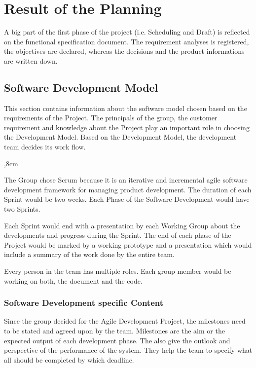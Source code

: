 \section{Result of the Planning}
A big part of the first phase of the project (i.e. Scheduling and Draft) is reflected on the functional specification document. The requirement analyses is registered, the objectives are declared, whereas the decisions and the product informations are written down.

\subsection{Software Development Model}

This section contains information about the software model chosen based on the requirements of the Project.
The principals of the group, the customer requirement and knowledge about the Project play an important role in choosing the Development Model. Based on the Development Model, the development team decides its work flow. 

\begin{description}
	,8cm
	\item[Agile Development Model: SCRUM] The Group chose Scrum because it is an iterative and incremental agile software development framework for managing product development. The duration of each Sprint would be two weeks. Each Phase of the Software Development would have two Sprints. 
	
	Each Sprint would end with a presentation by each Working Group about the developments and progress during the Sprint. The end of each phase of the Project would be marked by a working prototype and a presentation which would include a summary of the work done by the entire team. 
	
	\item[Projects specific Adaptation to the Model:] Every person in the team has multiple roles. Each group member would be working on both, the document and the code.
\end{description} 

\subsubsection{Software Development specific Content}
Since the group decided for the Agile Development Project, the milestones need to be stated and agreed upon by the team. Milestones are the aim or the expected output of each development phase. The also give the outlook and perspective of the performance of the system. They help the team to specify what all should be completed by which deadline.

